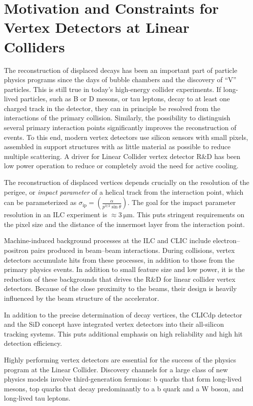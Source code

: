 \section{Motivation and Constraints for Vertex Detectors at Linear Colliders}

The reconstruction of displaced decays has been an important part of particle physics programs since the days of bubble chambers and the discovery of ``V'' particles. This is still true in today's high-energy collider experiments. If long-lived particles, such as B or D mesons, or tau leptons, decay to at least one charged track in the detector, they can in principle be resolved from the interactions of the primary collision. Similarly, the possibility to distinguish several primary interaction points significantly improves the reconstruction of events. To this end, modern vertex detectors use silicon sensors with small pixels, assembled in support structures with as little material as possible to reduce multiple scattering. A driver for Linear Collider vertex detector R\&D has been low power operation to reduce or completely avoid the need for active cooling.

The reconstruction of displaced vertices depends crucially on the resolution of the perigee, or \emph{impact parameter} of a helical track from the interaction point, which can be parameterized as $\sigma_\text{ip} = \left(\frac{\alpha}{p^{3/2}\sin\theta}\right).$
The goal for the impact parameter resolution in an ILC experiment is $\approx\SI{3}{\micro\meter}$. This puts stringent requirements on the pixel size and the distance of the innermost layer from the interaction point.

Machine-induced background processes at the ILC and CLIC include electron--positron pairs produced in beam--beam interactions. During collisions, vertex detectors accumulate hits from these processes, in addition to those from the primary physics events. In addition to small feature size and low power, it is the reduction of these backgrounds that drives the R\&D for linear collider vertex detectors. Because of the close proximity to the beams, their design is heavily influenced by the beam structure of the accelerator.

In addition to the precise determination of decay vertices, the CLICdp detector and the SiD concept have integrated vertex detectors into their all-silicon tracking systems. This puts additional emphasis on high reliability and high hit detection efficiency.

Highly performing vertex detectors are essential for the success of the physics program at the Linear Collider. Discovery channels for a large class of new physics models involve third-generation fermions: b quarks that form long-lived mesons, top quarks that decay predominantly to a b quark and a W boson, and long-lived tau leptons.
